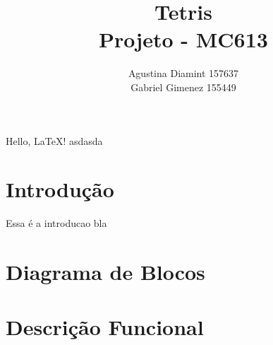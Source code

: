 \documentclass[a4paper,11pt]{article}
\begin{document}
\title{Tetris\\
	Projeto - MC613}
\author{Agustina Diamint 157637\\
 Gabriel Gimenez 155449}
\maketitle
Hello, \LaTeX! asdasda
\section{Introdu\c{c}\~ao}
Essa \'e a introducao bla
\section{Diagrama de Blocos}
\section{Descri\c{c}\~ao Funcional}
\end{document}
